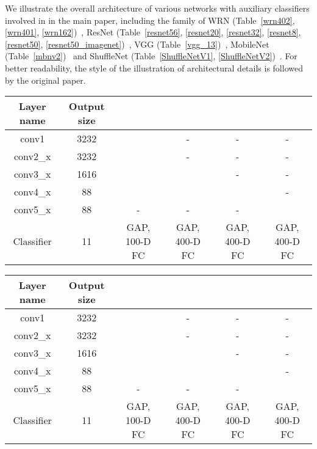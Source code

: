 \documentclass{article}
\begin{document}
We illustrate the overall architecture of various networks with auxiliary classifiers involved in in the main paper, including the family of WRN (Table~\ref{wrn402}, \ref{wrn401},  \ref{wrn162})~\cite{zagoruyko2016wide}, ResNet (Table~\ref{resnet56}, \ref{resnet20},  \ref{resnet32}, \ref{resnet8}, \ref{resnet50}, \ref{resnet50_imagenet})~\cite{he2016deep}, VGG (Table~\ref{vgg_13})~\cite{simonyan2014very}, MobileNet (Table~\ref{mbnv2})~\cite{sandler2018mobilenetv2} and ShuffleNet (Table~\ref{ShuffleNetV1}, \ref{ShuffleNetV2})~\cite{zhang2018shufflenet,ma2018shufflenet}. For better readability, the style of the illustration of architectural details is followed by the original paper.
\begin{table*}
	\centering
	\begin{tabular}{c|c|c|c|c|c}
		\hline
		Layer name & Output size & & & & \\ 	\hline
		conv1&  3232 &   &-&-&-\\  \hline
		conv2\_x &  3232              & 
		  &  -&  - &  -  \\  \hline
		conv3\_x &  1616           & 
		  &   & - & -  \\  \hline
		conv4\_x &  88           & 
		  &  &  & -  \\  \hline
		conv5\_x &  88           & - &  -&  - &    \\  \hline
		Classifier &  11  &  GAP, 100-D FC&  GAP, 400-D FC &  GAP, 400-D FC&  GAP, 400-D FC  \\  \hline
	\end{tabular}
	\caption{Architectural details of WRN-40-2 with auxiliary classifiers for CIFAR-100 classification.}
	\label{wrn402}
\end{table*}


\begin{table*}
	\centering
	\begin{tabular}{c|c|c|c|c|c}
		\hline
		Layer name & Output size & & & & \\ 	\hline
		conv1&  3232 &   &-&-&-\\  \hline
		conv2\_x &  3232              & 
		  &  -&  - &  -  \\  \hline
		conv3\_x &  1616           & 
		  &   & - & -  \\  \hline
		conv4\_x &  88           & 
		  &  &  & -  \\  \hline
		conv5\_x &  88           & - &  -&  - &    \\  \hline
		Classifier &  11  &  GAP, 100-D FC&  GAP, 400-D FC &  GAP, 400-D FC&  GAP, 400-D FC  \\  \hline
	\end{tabular}
	\caption{Architectural details of WRN-40-1  with auxiliary classifiers for CIFAR-100 classification.}
	\label{wrn401}
\end{table*}
\end{document}

